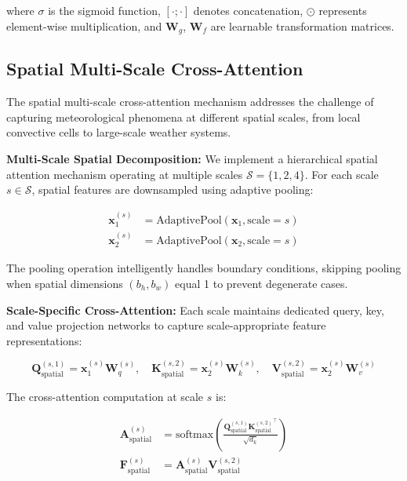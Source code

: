 where $\sigma$ is the sigmoid function, $[\cdot;\cdot]$ denotes concatenation, $\odot$ represents element-wise multiplication, and $\mathbf{W}_g$, $\mathbf{W}_f$ are learnable transformation matrices.

\subsection{Spatial Multi-Scale Cross-Attention}

The spatial multi-scale cross-attention mechanism addresses the challenge of capturing meteorological phenomena at different spatial scales, from local convective cells to large-scale weather systems.

\textbf{Multi-Scale Spatial Decomposition:} We implement a hierarchical spatial attention mechanism operating at multiple scales $\mathcal{S} = \{1, 2, 4\}$. For each scale $s \in \mathcal{S}$, spatial features are downsampled using adaptive pooling:

\begin{align}
\mathbf{x}_1^{(s)} &= \text{AdaptivePool}(\mathbf{x}_1, \text{scale}=s) \\
\mathbf{x}_2^{(s)} &= \text{AdaptivePool}(\mathbf{x}_2, \text{scale}=s)
\end{align}

The pooling operation intelligently handles boundary conditions, skipping pooling when spatial dimensions $(b_h, b_w)$ equal 1 to prevent degenerate cases.

\textbf{Scale-Specific Cross-Attention:} Each scale maintains dedicated query, key, and value projection networks to capture scale-appropriate feature representations:

\begin{equation}
\mathbf{Q}_{\text{spatial}}^{(s,1)} = \mathbf{x}_1^{(s)} \mathbf{W}_q^{(s)}, \quad \mathbf{K}_{\text{spatial}}^{(s,2)} = \mathbf{x}_2^{(s)} \mathbf{W}_k^{(s)}, \quad \mathbf{V}_{\text{spatial}}^{(s,2)} = \mathbf{x}_2^{(s)} \mathbf{W}_v^{(s)}
\end{equation}

The cross-attention computation at scale $s$ is:

\begin{align}
\mathbf{A}_{\text{spatial}}^{(s)} &= \text{softmax}\left(\frac{\mathbf{Q}_{\text{spatial}}^{(s,1)} {\mathbf{K}_{\text{spatial}}^{(s,2)}}^{\top}}{\sqrt{d_k}}\right) \\
\mathbf{F}_{\text{spatial}}^{(s)} &= \mathbf{A}_{\text{spatial}}^{(s)} \mathbf{V}_{\text{spatial}}^{(s,2)}
\end{align}

